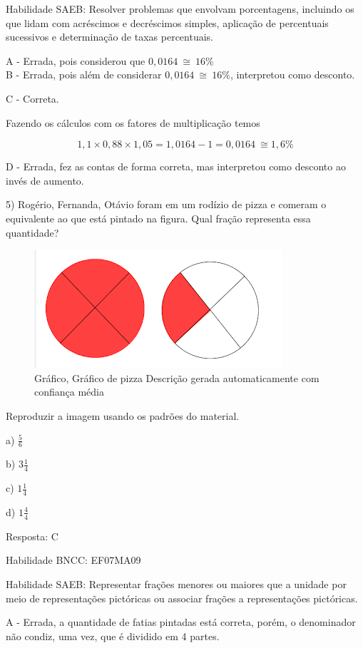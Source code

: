 {Habilidade SAEB: Resolver problemas que envolvam porcentagens, incluindo
os que lidam com acréscimos e decréscimos simples, aplicação de
percentuais sucessivos e determinação de taxas percentuais.

A - Errada, pois considerou que \(0,0164\  \cong \ 16\%\)\\
B - Errada, pois além de considerar \(0,0164\  \cong \ 16\%\),
interpretou como desconto.

C - Correta.

Fazendo os cálculos com os fatores de multiplicação temos

\[1,1 \times 0,88 \times 1,05 = 1,0164 - 1 = 0,0164\  \cong 1,6\%\]

D - Errada, fez as contas de forma correta, mas interpretou como
desconto ao invés de aumento.

5) Rogério, Fernanda, Otávio foram em um rodízio de pizza e comeram o
equivalente ao que está pintado na figura. Qual fração representa essa
quantidade?

\begin{figure}
\centering
\includegraphics[width=3.625in,height=1.72917in]{./imgSAEB_7_MAT/media/image95.png}
\caption{Gráfico, Gráfico de pizza Descrição gerada automaticamente com
confiança média}
\end{figure}

Reproduzir a imagem usando os padrões do material.

a) \(\frac{5}{6}\)

b) \(3\frac{1}{4}\)

c) \(1\frac{1}{4}\)

d) \(1\frac{4}{4}\)

Resposta: C

Habilidade BNCC: EF07MA09

Habilidade SAEB: Representar frações menores ou maiores que a unidade
por meio de representações pictóricas ou associar frações a
representações pictóricas.

A - Errada, a quantidade de fatias pintadas está correta, porém, o
denominador não condiz, uma vez, que é dividido em 4 partes.

}
